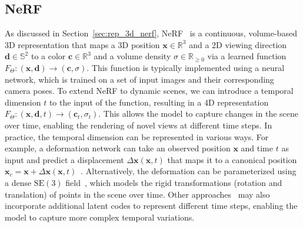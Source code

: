 \subsection{NeRF}
\label{sec:rep_4d_nerf}
As discussed in Section~\ref{sec:rep_3d_nerf}, NeRF~\cite{mildenhall2021nerf} is a continuous, volume-based 3D representation that maps a 3D position $\mathbf{x} \in \mathbb{R}^3$ and a 2D viewing direction $\mathbf{d} \in \mathbb{S}^2$ to a color $\mathbf{c} \in \mathbb{R}^3$ and a volume density $\sigma \in \mathbb{R}_{\geq 0}$ via a learned function $F_\Theta:(\mathbf{x}, \mathbf{d}) \rightarrow (\mathbf{c}, \sigma)$.
This function is typically implemented using a neural network, which is trained on a set of input images and their corresponding camera poses.
To extend NeRF to dynamic scenes, we can introduce a temporal dimension $t$ to the input of the function, resulting in a 4D representation
$F_\Theta: (\mathbf{x}, \mathbf{d}, t) \rightarrow (\mathbf{c}_t, \sigma_t)$.
This allows the model to capture changes in the scene over time, enabling the rendering of novel views at different time steps.
In practice, the temporal dimension can be represented in various ways.
For example, a deformation network can take an observed position $\mathbf{x}$ and time $t$ as input and predict a displacement $\Delta\mathbf{x}(\mathbf{x},t)$ that maps it to a canonical position $\mathbf{x}_c=\mathbf{x}+\Delta\mathbf{x}(\mathbf{x},t)$~\cite{pumarola2021d}.
Alternatively, the deformation can be parameterized using a dense
$\text{SE}(3)$ field~\cite{park2021nerfies}, which models the rigid transformations (rotation and translation) of points in the scene over time.
Other approaches~\cite{gao2021dynamic} may also incorporate additional latent codes to represent different time steps, enabling the model to capture more complex temporal variations.







